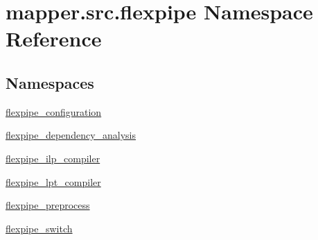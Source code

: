 \hypertarget{namespacemapper_1_1src_1_1flexpipe}{}\section{mapper.\+src.\+flexpipe Namespace Reference}
\label{namespacemapper_1_1src_1_1flexpipe}
\subsection*{Namespaces}
\begin{DoxyCompactItemize}
\item 
 \hyperlink{namespacemapper_1_1src_1_1flexpipe_1_1flexpipe__configuration}{flexpipe\+\_\+configuration}
\item 
 \hyperlink{namespacemapper_1_1src_1_1flexpipe_1_1flexpipe__dependency__analysis}{flexpipe\+\_\+dependency\+\_\+analysis}
\item 
 \hyperlink{namespacemapper_1_1src_1_1flexpipe_1_1flexpipe__ilp__compiler}{flexpipe\+\_\+ilp\+\_\+compiler}
\item 
 \hyperlink{namespacemapper_1_1src_1_1flexpipe_1_1flexpipe__lpt__compiler}{flexpipe\+\_\+lpt\+\_\+compiler}
\item 
 \hyperlink{namespacemapper_1_1src_1_1flexpipe_1_1flexpipe__preprocess}{flexpipe\+\_\+preprocess}
\item 
 \hyperlink{namespacemapper_1_1src_1_1flexpipe_1_1flexpipe__switch}{flexpipe\+\_\+switch}
\end{DoxyCompactItemize}
